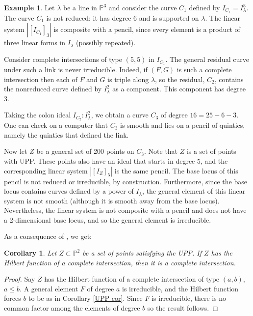 \documentclass[12pt]{amsart}%
\numberwithin{equation}{section}
\newtheorem{corollary}[theorem]{Corollary}
\theoremstyle{definition}
\newtheorem{example}[theorem]{Example}
\numberwithin{equation}{section}
\begin{document}
\begin{example}
    Let $\lambda$ be a line in $\mathbb P^3$ and consider the curve $C_1$ defined by $I_{C_1} = I_\lambda^3$. The curve $C_1$ is not reduced: it has degree 6 and is supported on $\lambda$. The linear system $|[I_{C_1}]_3|$ is composite with a pencil, since every element is a product of three linear forms in $I_\lambda$ (possibly repeated).

    Consider complete intersections of type $(5,5)$ in $I_{C_1}$. The general residual curve under such a link is never irreducible. Indeed, if $(F,G)$ is such a complete intersection then each of $F$ and $G$ is triple along $\lambda$, so the residual, $C_2$, contains the nonreduced curve defined by $I_\lambda^2$ as a component. This component has degree 3.

    Taking the colon ideal $I_{C_2} : I_\lambda^2$, we obtain a  curve $C_3$ of degree $16 = 25 - 6 - 3$. One can check on a computer that $C_3$ is smooth and lies on a pencil of quintics, namely the quintics that defined the link. 

    Now let $Z$ be a general set of 200 points on $C_3$. Note that $Z$ is a set of points with UPP. These points also have an ideal that starts in degree 5, and the corresponding linear system $|[I_Z]_5|$ is the same pencil. The base locus of this pencil is not reduced or irreducible, by construction. Furthermore, since the base locus contains curves defined by a power  of $I_\lambda$, the general element of this linear system is not smooth (although it is smooth away from the base locus). Nevertheless, the linear system is not composite with a pencil and does not have a 2-dimensional base locus, and so the general element is irreducible.
\end{example}

As a consequence of , we get: 

\begin{corollary} \label{cor:HF of CI}
    Let $Z \subset \mathbb P^2$ be a set of points satisfying the UPP. If $Z$ has the Hilbert function of a complete intersection, then it is a complete intersection.
\end{corollary}

\begin{proof}
    Say $Z$ has the Hilbert function of a complete intersection of type $(a,b)$, $a \leq b$. A general element $F$ of degree $a$ is irreducible, and the Hilbert function forces $b$ to be as in Corollary \ref{UPP cor}. Since $F$ is irreducible, there is no common factor among the elements of degree $b$ so the result follows.
\end{proof}
\end{document}
